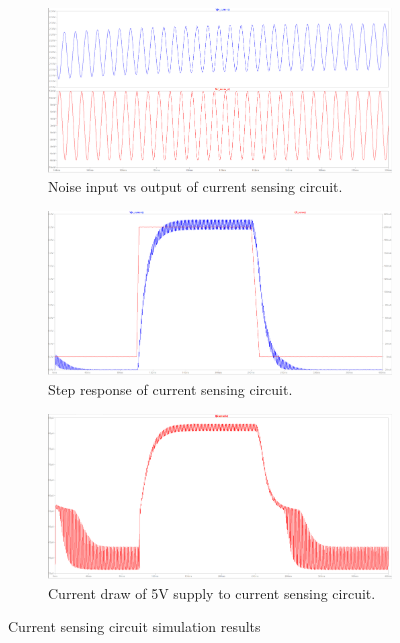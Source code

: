 \begin{figure}[H]
\centering
\begin{subfigure}[]{0.45\textwidth}
\includegraphics[width=\linewidth]{./Figures/CurSens_NoiseResp.png}
\caption{Noise input vs output of current sensing circuit.}
\label{subfig:cursen_sim_noise}	
\end{subfigure}
\hfill
\begin{subfigure}[]{0.45\textwidth}
\includegraphics[width=\linewidth]{./Figures/CurSens_StepResp.png}
\caption{Step response of current sensing circuit.} 			
\label{subfig:cursen_sim_step}	
\end{subfigure}
\vspace{2pt}
\begin{subfigure}[]{0.45\textwidth}
\includegraphics[width=\linewidth]{./Figures/CurSens_CurDraw.png}
\caption{Current draw of 5V supply to current sensing circuit.}
\label{subfig:cursen_sim_curdraw}	
\end{subfigure}
\caption{Current sensing circuit simulation results}
\label{fig:cursen_sim_res}
\end{figure}

